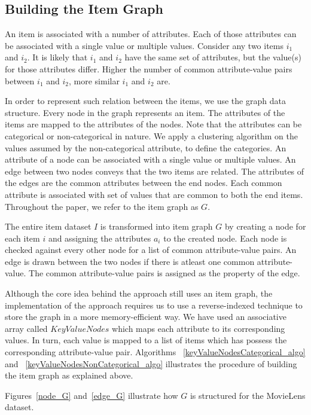 \documentclass{acm_proc_article-sp}
\begin{document}
\subsection{Building the Item Graph}
\label{sec:buidingItemGraph}
An item is associated with a number of attributes. Each of those attributes can be associated with a single value or multiple values. Consider any two items $i_1$ and $i_2$. It is likely that $i_1$ and $i_2$ have the same set of attributes, but the value(s) for those attributes differ. Higher the number of common attribute-value pairs between $i_1$ and $i_2$, more similar $i_1$ and $i_2$ are.

In order to represent such relation between the items, we use the graph data structure. Every node in the graph represents an item. The attributes of the items are mapped to the attributes of the nodes. Note that the attributes can be categorical or non-categorical in nature. We apply a clustering algorithm on the values assumed by the non-categorical attribute, to define the categories. An attribute of a node can be associated with a single value or multiple values. An edge between two nodes conveys that the two items are related. The attributes of the edges are the common attributes between the end nodes. Each common attribute is associated with set of values that are common to both the end items. Throughout the paper, we refer to the item graph as $G$. 

The entire item dataset $I$ is transformed into item graph $G$ by creating a node for each item $i$ and assigning the attributes $a_i$ to the created node. Each node is checked against every other node for a list of common attribute-value pairs. An edge is drawn between the two nodes if there is atleast one common attribute-value. The common attribute-value pairs is assigned as the property of the edge.

Although the core idea behind the approach still uses an item graph, the implementation of the approach requires us to use a reverse-indexed technique to store the graph in a more memory-efficient way. We have used an associative array called $KeyValueNodes$ which maps each attribute to its corresponding values. In turn, each value is mapped to a list of items which has possess the corresponding attribute-value pair. Algorithms ~\ref{keyValueNodesCategorical_algo} and ~\ref{keyValueNodesNonCategorical_algo} illustrates the procedure of building the item graph as explained above.

Figures~\ref{node_G} and~\ref{edge_G} illustrate how $G$ is structured for the MovieLens dataset.
\end{document}
